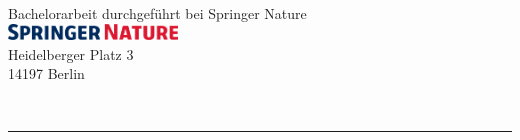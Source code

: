 \begin{titlepage}
	\centering
	
	{\large Bachelorarbeit durchgeführt bei Springer Nature} \\[4mm]
	\includegraphics[width=4.5cm]{gfx/springernature} \\[2mm]
	\hspace*{15pt}
	{\small Heidelberger Platz 3} \\[-1mm]
	{\small 14197 Berlin} 
	  	
	  	
	\hfill
	\vfill
	{\LARGE \color{ctcolortitle}\textbf{\thesisTitle} \\}
	\rule[2pt]{\textwidth}{.4pt} \\
	\Large{\thesisSubtitle} \\
	\small{\thesisZeitraum} \\[25mm]
	
	\begin{center}
	\Large\thesisName\\[5mm]
	\small{\thesisMatrikelNr} \\
	\small{\thesisSemester}\\
	\small{\thesisFachsemester}\\
	\small{\thesisUniversityDepartment} \\
	\small{\thesisUniversity}
	\end{center}		
	\par
	

\end{titlepage}
